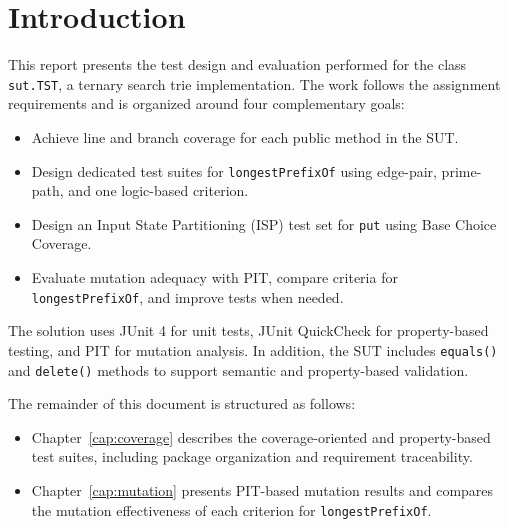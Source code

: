 \chapter{Introduction} \label{cap:intro}

This report presents the test design and evaluation performed for the class \texttt{sut.TST}, a ternary search trie implementation.
The work follows the assignment requirements and is organized around four complementary goals:

\begin{itemize}
	\item Achieve line and branch coverage for each public method in the SUT.
	\item Design dedicated test suites for \texttt{longestPrefixOf} using edge-pair, prime-path, and one logic-based criterion.
	\item Design an Input State Partitioning (ISP) test set for \texttt{put} using Base Choice Coverage.
	\item Evaluate mutation adequacy with PIT, compare criteria for \texttt{longestPrefixOf}, and improve tests when needed.
\end{itemize}

The solution uses JUnit 4 for unit tests, JUnit QuickCheck for property-based testing, and PIT for mutation analysis.
In addition, the SUT includes \texttt{equals()} and \texttt{delete()} methods to support semantic and property-based validation.

The remainder of this document is structured as follows:
\begin{itemize}
    \item Chapter~\ref{cap:coverage} describes the coverage-oriented and property-based test suites, including package organization and requirement traceability.
    \item Chapter~\ref{cap:mutation} presents PIT-based mutation results and compares the mutation effectiveness of each criterion for \texttt{longestPrefixOf}.
\end{itemize}